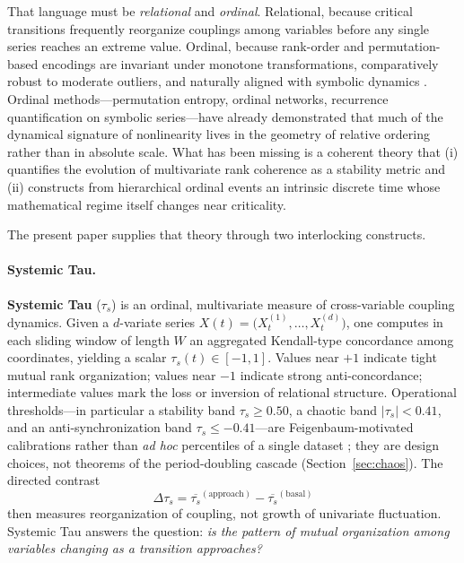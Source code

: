 \documentclass[11pt,a4paper]{article}
\begin{document}
That language must be \emph{relational} and \emph{ordinal}.
Relational, because critical transitions frequently reorganize couplings
among variables before any single series reaches an extreme value.
Ordinal, because rank-order and permutation-based encodings are invariant
under monotone transformations, comparatively robust to moderate
outliers, and naturally aligned with symbolic dynamics
\cite{BandtPompe2002,Amigo2010,Keller2019}. Ordinal methods---permutation
entropy, ordinal networks, recurrence quantification on symbolic
series---have already demonstrated that much of the dynamical signature of
nonlinearity lives in the geometry of relative ordering rather than in
absolute scale. What has been missing is a coherent theory that (i)
quantifies the evolution of multivariate rank coherence as a stability
metric and (ii) constructs from hierarchical ordinal events an intrinsic
discrete time whose mathematical regime itself changes near criticality.

The present paper supplies that theory through two interlocking
constructs.

\paragraph{Systemic Tau.}
\textbf{Systemic Tau} ($\tau_s$) is an ordinal, multivariate measure of
cross-variable coupling dynamics. Given a $d$-variate series
$X(t)=\bigl(X^{(1)}_t,\ldots,X^{(d)}_t\bigr)$, one computes in each
sliding window of length $W$ an aggregated Kendall-type concordance among
coordinates, yielding a scalar $\tau_s(t)\in[-1,1]$. Values near $+1$
indicate tight mutual rank organization; values near $-1$ indicate strong
anti-concordance; intermediate values mark the loss or inversion of
relational structure. Operational thresholds---in particular a
stability band $\tau_s\geq 0.50$, a chaotic band $|\tau_s|<0.41$, and an
anti-synchronization band $\tau_s\leq -0.41$---are Feigenbaum-motivated
calibrations rather than \emph{ad hoc} percentiles of a single dataset
\cite{Feigenbaum1978,Feigenbaum1983}; they are design choices, not
theorems of the period-doubling cascade (Section~\ref{sec:chaos}). The directed contrast
\[
\Delta\tau_s
=\overline{\tau_s}^{(\mathrm{approach})}
-\overline{\tau_s}^{(\mathrm{basal})}
\]
then measures reorganization of coupling, not growth of univariate
fluctuation. Systemic Tau answers the question: \emph{is the pattern of
mutual organization among variables changing as a transition approaches?}
\end{document}
